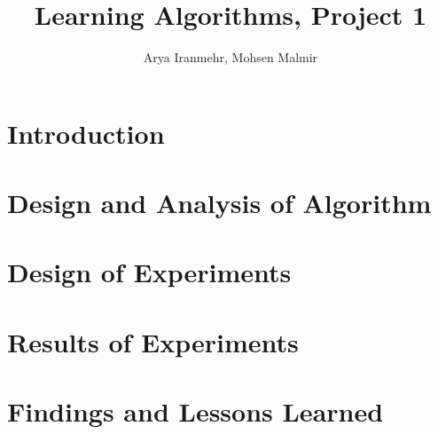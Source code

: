 \documentclass[twoside,12pt]{article}
\begin{document}
\title{Learning Algorithms, Project 1}
\author{Arya Iranmehr, Mohsen Malmir}
\maketitle

\section{Introduction}

\section{Design and Analysis of Algorithm}

\section{Design of Experiments}

\section{Results of Experiments}

\section{Findings and Lessons Learned}
\end{document}
